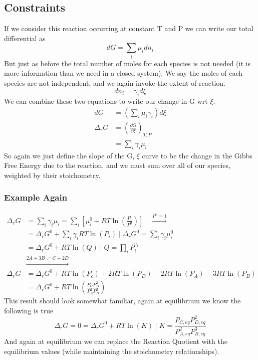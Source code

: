 \documentclass{article}
\begin{document}
\subsection*{Constraints}
If we consider this reaction occurring at constant T and P we can write our total differential as
\begin{equation}
dG = \sum_i \mu_idn_i
\end{equation}
But just as before the total number of moles for each species is not needed (it is more information than we need in a closed system). 
We say the moles of each species are not independent, and we again invoke the extent of reaction.  
\begin{equation}
dn_i = \gamma_id\xi
\end{equation}
We can combine these two equations to write our change in G wrt $\xi$. 
\begin{equation}
\begin{split}
dG &= \left(\sum_i\mu_i\gamma_i\right)d\xi \\
\Delta_rG &= \left(\frac{\partial G}{\partial \xi}
\right)_{T,P} \\
&= \sum_i \gamma_i \mu_i
\end{split}
\end{equation}
So again we just define the slope of the G, $\xi$ curve to be the change in the Gibbs Free Energy due to the reaction, and we must sum over all of our species, weighted by their stoichometry. 

\subsubsection*{Example Again}
\begin{equation}
\begin{split}
    \Delta_rG &= \sum_i \gamma_i \mu_i = \sum_i \left[\mu_i^0 + RT \ln(\frac{P_i}{P^0})\right] \quad \xrightarrow{P^0 = 1}\\
    &= \Delta_rG^0 + \sum_i \gamma_iRT\ln(P_i) \mid \Delta_rG^0 = \sum_i \gamma_i\mu_i^0\\
    &= \Delta_rG^0 + RT\ln(Q) \mid Q = \prod_i P_i^{\gamma_i}\\
   & \xrightarrow{2A + 3B \rightleftharpoons C + 2D}\\
   \Delta_rG &= \Delta_rG^0 + RT\ln(P_c) + 2RT\ln(P_D) - 2RT\ln(P_A) - 3RT\ln(P_B) \\
   &= \Delta_rG^0 + RT \ln\left(\frac{P_CP_D^2}{P_A^2P_B^3}\right)
\end{split}
\end{equation}
This result should look somewhat familiar, again at equilibrium we know the following is true
\begin{equation}
\Delta_rG = 0 = \Delta_rG^0 + RT\ln(K) \mid K = \frac{P_{C,eq}P_{D,eq}^{2}}{P_{A,eq}^{2}P_{B,eq}^{3}}
\end{equation}
And again at equilibrium we can replace the Reaction Quotient with the equilibrium values (while maintaining the stoichometry relationships). 
\end{document}
